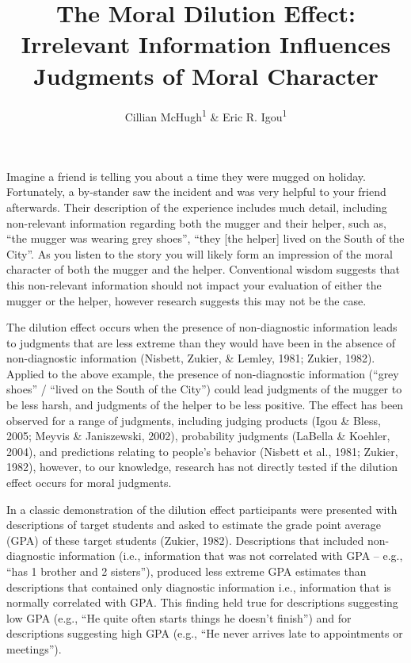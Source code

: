 \documentclass[
  man,floatsintext]{apa6}
\title{The Moral Dilution Effect: Irrelevant Information Influences Judgments of Moral Character}
\author{Cillian McHugh\textsuperscript{1} \& Eric R. Igou\textsuperscript{1}}
\date{}
\affiliation{\vspace{0.5cm}\textsuperscript{1} University of Limerick}
\begin{document}
\maketitle

Imagine a friend is telling you about a time they were mugged on holiday. Fortunately, a by-stander saw the incident and was very helpful to your friend afterwards. Their description of the experience includes much detail, including non-relevant information regarding both the mugger and their helper, such as, ``the mugger was wearing grey shoes'', ``they {[}the helper{]} lived on the South of the City''. As you listen to the story you will likely form an impression of the moral character of both the mugger and the helper. Conventional wisdom suggests that this non-relevant information should not impact your evaluation of either the mugger or the helper, however research suggests this may not be the case.

The dilution effect occurs when the presence of non-diagnostic information leads to judgments that are less extreme than they would have been in the absence of non-diagnostic information (Nisbett, Zukier, \& Lemley, 1981; Zukier, 1982). Applied to the above example, the presence of non-diagnostic information (``grey shoes'' / ``lived on the South of the City'') could lead judgments of the mugger to be less harsh, and judgments of the helper to be less positive. The effect has been observed for a range of judgments, including judging products (Igou \& Bless, 2005; Meyvis \& Janiszewski, 2002), probability judgments (LaBella \& Koehler, 2004), and predictions relating to people's behavior (Nisbett et al., 1981; Zukier, 1982), however, to our knowledge, research has not directly tested if the dilution effect occurs for moral judgments.

In a classic demonstration of the dilution effect participants were presented with descriptions of target students and asked to estimate the grade point average (GPA) of these target students (Zukier, 1982). Descriptions that included non-diagnostic information (i.e., information that was not correlated with GPA -- e.g., ``has 1 brother and 2 sisters''), produced less extreme GPA estimates than descriptions that contained only diagnostic information i.e., information that is normally correlated with GPA. This finding held true for descriptions suggesting low GPA (e.g., ``He quite often starts things he doesn't finish'') and for descriptions suggesting high GPA (e.g., ``He never arrives late to appointments or meetings'').
\end{document}
